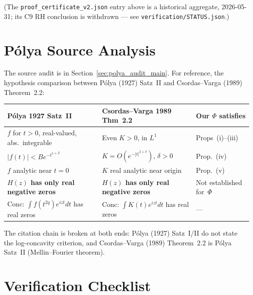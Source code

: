 \documentclass[11pt]{article}
\theoremstyle{definition}
\theoremstyle{remark}
\begin{document}
\medskip\noindent
(The \texttt{proof\_certificate\_v2.json} entry above is a historical
aggregate, 2026-05-31; its C9 RH conclusion is withdrawn --- see
\texttt{verification/STATUS.json}.)

\section{P\'{o}lya Source Analysis}\label{sec:polya_audit}

The source audit is in Section~\ref{sec:polya_audit_main}.
For reference, the hypothesis comparison between P\'{o}lya (1927) Satz~II and
Csordas--Varga (1989) Theorem~2.2:

\begin{center}\small
\begin{tabular}{@{}p{4.2cm}p{4.8cm}p{2.6cm}@{}}
\toprule
P\'{o}lya 1927 Satz~II & Csordas--Varga 1989 Thm~2.2 & Our $\Phi$ satisfies \\
\midrule
$f$ for $t>0$, real-valued, abs.\ integrable & Even $K > 0$, in $L^1$ & Props~(i)--(iii) \\
$|f(t)|<Be^{-t^{1+\beta}}$ & $K = O(e^{-|t|^{2+\delta}})$, $\delta>0$ & Prop.~(iv) \\
$f$ analytic near $t=0$ & $K$ real analytic near origin & Prop.~(v) \\
\textbf{$H(z)$ has only real negative zeros} &
  \textbf{$H(z)$ has only real negative zeros} &
  Not established for~$\Phi$ \\
Conc: $\int f(t^{2q})e^{izt}dt$ has real zeros &
  Conc: $\int K(t)e^{izt}dt$ has real zeros & --- \\
\bottomrule
\end{tabular}
\end{center}

The citation chain is broken at both ends: P\'{o}lya (1927) Satz~I/II do not state
the log-concavity criterion, and Csordas--Varga (1989) Theorem~2.2 is P\'{o}lya Satz~II
(Mellin--Fourier theorem).

\section{Verification Checklist}\label{sec:checklist}
\end{document}
